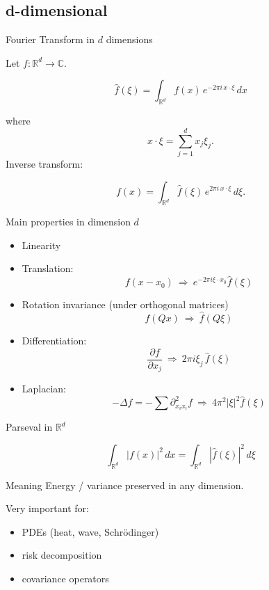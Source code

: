\documentclass[aspectratio=169]{beamer}
\begin{document}
\subsection{d-dimensional}

\begin{frame}{Fourier Transform in $d$ dimensions}

Let $f:\mathbb{R}^d\to\mathbb{C}$.

\[
\hat f(\xi)
=
\int_{\mathbb{R}^d}
f(x)\,e^{-2\pi i\, x\cdot \xi}\,dx
\]

where
\[
x\cdot \xi = \sum_{j=1}^d x_j\xi_j.
\]
\pause
Inverse transform:

\[
f(x)
=
\int_{\mathbb{R}^d}
\hat f(\xi)\,e^{2\pi i\, x\cdot \xi}\,d\xi.
\]

\end{frame}

\begin{frame}{Main properties in dimension $d$}

\begin{itemize}
    \item Linearity
    \item Translation:
    \[
    f(x-x_0)\ \Longrightarrow\ e^{-2\pi i \xi\cdot x_0}\hat f(\xi)
    \]

    \item Rotation invariance (under orthogonal matrices)
    \[
    f(Qx)\ \Longrightarrow\ \hat f(Q\xi)
    \]

    \item Differentiation:
    \[
    \frac{\partial f}{\partial x_j}
    \ \Longrightarrow\
    2\pi i\xi_j\,\hat f(\xi)
    \]

    \item Laplacian:
    \[
    -\Delta f = - \sum \partial^2_{x_i x_i}f
    \ \Longrightarrow\
    4\pi^2|\xi|^2\hat f(\xi)
    \]
\end{itemize}

\end{frame}

\begin{frame}{Parseval in $\mathbb{R}^d$}

\[
\int_{\mathbb{R}^d} |f(x)|^2\,dx
=
\int_{\mathbb{R}^d} |\hat f(\xi)|^2\,d\xi
\]
\pause
\begin{block}{Meaning}
Energy / variance preserved in any dimension.
\end{block}

Very important for:
\begin{itemize}
    \item PDEs (heat, wave, Schrödinger)
    \item risk decomposition
    \item covariance operators
\end{itemize}

\end{frame}
\end{document}
